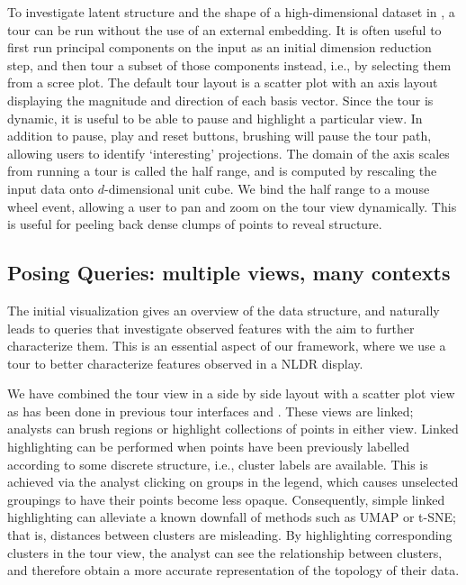 \documentclass[article,notitle]{jdssv}
\begin{document}
To investigate latent structure and the shape of a high-dimensional dataset in
, a tour can be run without the use of an external embedding.
It is often useful to
first run principal components on the input as an initial dimension reduction
step, and then tour a subset of those components instead, i.e., by selecting
them from a scree plot. The default tour layout is a scatter plot with an axis
layout displaying the magnitude and direction of each basis vector. Since the
tour is dynamic, it is useful to be able to pause and highlight a
particular view. In addition to pause, play and reset buttons, brushing will
pause the tour path, allowing users to identify `interesting' projections.
The
domain of the axis scales from running a tour is called the half range, and is
computed by rescaling the input data onto \(d\)-dimensional unit cube. We bind
the half range to a mouse wheel event, allowing a user to pan and zoom on the
tour view dynamically. This is useful for peeling back dense clumps of points
to reveal structure.

\hypertarget{posing-queries-multiple-views-many-contexts}{%
\subsection{Posing Queries: multiple views, many contexts}\label{posing-queries-multiple-views-many-contexts}}

The initial visualization gives an overview of the data structure,
and naturally leads to queries that investigate observed features with
the aim to further characterize them. This is an essential aspect of
our framework, where we use a tour to better characterize
features observed in a NLDR display.

We have combined the tour view in a side by side layout with a scatter plot
view as has been done in previous tour interfaces  and 
\citep{Buja1986-ku, Swayne1998-uq}. These views are
linked; analysts can brush regions or highlight collections of points in either
view. Linked highlighting can be performed when points have been previously
labelled according to some discrete structure, i.e., cluster labels are
available. This is achieved via the analyst clicking on groups in the legend,
which causes unselected groupings to have their points become less opaque.
Consequently, simple linked highlighting can alleviate a known downfall of
methods such as UMAP or t-SNE; that is, distances between clusters are
misleading. By highlighting corresponding clusters in the tour view, the
analyst can see the relationship between clusters, and therefore obtain a more
accurate representation of the topology of their data.
\end{document}

